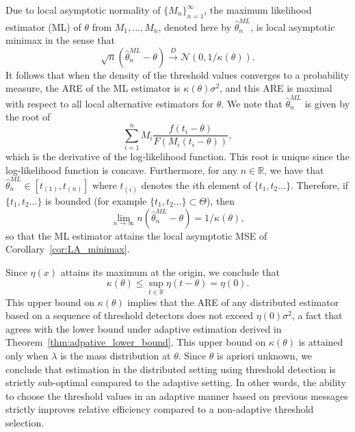 \documentclass[letterpaper, 11pt]{IEEEtran}      %
\begin{document}
Due to local asymptotic normality of $\{M_n\}_{n=1}^\infty$, the maximum likelihood estimator (ML) of $\theta$ from $M_1,\ldots,M_n$, denoted here by 
$\hat{\theta}^{ML}_n$, is local asymptotic minimax in the sense that 
\[
\sqrt{n} \left( \hat{\theta}^{ML}_n - \theta \right) \overset{D}{\longrightarrow} \mathcal{N} \left(0, 1/\kappa(\theta) \right). 
\]
It follows that when the density of the threshold values converges to a probability measure, the ARE of the ML estimator is $\kappa(\theta)\sigma^2$, and this ARE is maximal with respect to all local alternative estimators for $\theta$. We note that $\hat{\theta}^{ML}_n$ is given by the root of 
\begin{equation}
\label{eq:ML}
\sum_{i=1}^n M_i \frac{f \left( t_i-\theta\right) }{F \left(M_i  (t_i-\theta)\right) },  
\end{equation}
which is the derivative of the log-likelihood function. This root is unique since the log-likelihood function is concave. Furthermore, for any $n \in \mathbb R$, we have that $\hat{\theta}^{ML}_n  \in [t_{(1)}, t_{(n)}]$ where $t_{(i)}$ denotes the $i$th element of $\{t_1,t_2\ldots\}$. Therefore, if $\{t_1,t_2\ldots\}$ is bounded (for example $\{t_1,t_2\ldots\} \subset \Theta$), then 
\[
\lim_{n\to \infty} n\left(\hat{\theta}^{ML}_n - \theta \right)  = 1/\kappa(\theta), 
\] 
so that the ML estimator attains the local asymptotic MSE of Corollary~\ref{cor:LA_minimax}. \par
%
Since $\eta(x)$ attains its maximum at the origin, we conclude that
\[
\kappa(\theta) \leq \sup_{t\in \mathbb R} \eta \left( t-\theta\right) = \eta(0).
\]
This upper bound on $\kappa(\theta)$ implies that the ARE of any distributed estimator based on a sequence of threshold detectors does not exceed $\eta(0)\sigma^2$, a fact that agrees with the lower bound under adaptive estimation derived in Theorem~\ref{thm:adpative_lower_bound}. 
%
This upper bound on $\kappa(\theta)$ is attained only when $\lambda$ is the mass distribution at $\theta$. Since $\theta$ is apriori unknown, we conclude that estimation in the distributed setting using threshold detection is strictly sub-optimal compared to the adaptive setting. In other words, the ability to choose the threshold values in an adaptive manner based on previous messages strictly improves relative efficiency compared to a non-adaptive threshold selection.  \\

\end{document}
